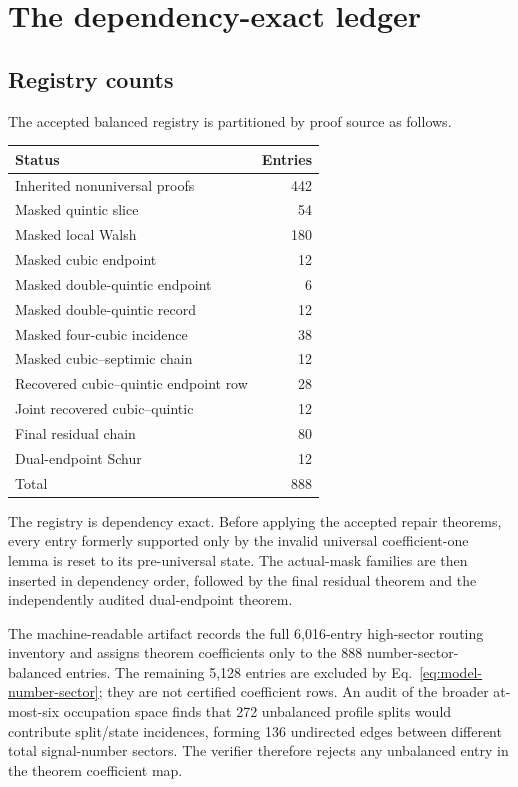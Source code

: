 \section{The dependency-exact ledger}
\label{app:ledger}

\subsection{Registry counts}

The accepted balanced registry is partitioned by proof source as follows.

\begin{center}
\small
\begin{tabular}{lr}
\toprule
Status & Entries \\
\midrule
Inherited nonuniversal proofs & 442 \\
Masked quintic slice & 54 \\
Masked local Walsh & 180 \\
Masked cubic endpoint & 12 \\
Masked double-quintic endpoint & 6 \\
Masked double-quintic record & 12 \\
Masked four-cubic incidence & 38 \\
Masked cubic--septimic chain & 12 \\
Recovered cubic--quintic endpoint row & 28 \\
Joint recovered cubic--quintic & 12 \\
Final residual chain & 80 \\
Dual-endpoint Schur & 12 \\
\midrule
Total & 888 \\
\bottomrule
\end{tabular}
\end{center}

The registry is dependency exact. Before applying the accepted repair theorems, every entry formerly supported only by the invalid universal coefficient-one lemma is reset to its pre-universal state. The actual-mask families are then inserted in dependency order, followed by the final residual theorem and the independently audited dual-endpoint theorem.

The machine-readable artifact records the full 6,016-entry high-sector routing inventory and assigns theorem coefficients only to the 888 number-sector-balanced entries. The remaining 5,128 entries are excluded by Eq.~\eqref{eq:model-number-sector}; they are not certified coefficient rows. An audit of the broader at-most-six occupation space finds that 272 unbalanced profile splits would contribute split/state incidences, forming 136 undirected edges between different total signal-number sectors. The verifier therefore rejects any unbalanced entry in the theorem coefficient map.


